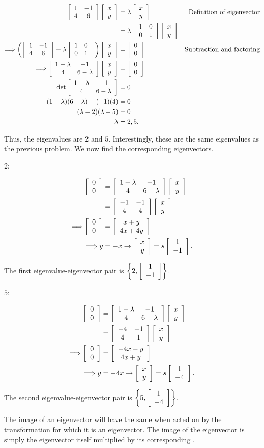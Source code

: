 \documentclass[../key.tex]{subfiles}
\begin{document}
\begin{align*}
\twomat{1}{-1}{4}{6}\twovec{x}{y} &= \lambda\twovec{x}{y} & \text{Definition of eigenvector} \\
&= \lambda\twomat{1}{0}{0}{1}\twovec{x}{y} \\
\Longrightarrow \left(\twomat{1}{-1}{4}{6}-\lambda\twomat{1}{0}{0}{1}\right)\twovec{x}{y}&=\twovec{0}{0} & \text{Subtraction and factoring} \\
\Longrightarrow \twomat{1-\lambda}{-1}{4}{6-\lambda}\twovec{x}{y} &= \twovec{0}{0} \\
\det \twomat{1-\lambda}{-1}{4}{6-\lambda} &= 0 \\
(1-\lambda)(6-\lambda)-(-1)(4) &= 0 \\
(\lambda-2)(\lambda-5) &= 0 \\
\lambda &= 2,5.\\
\end{align*}

Thus, the eigenvalues are $2$ and $5$. Interestingly, these are the same eigenvalues as the previous problem. We now find the corresponding eigenvectors.

$2$:

\begin{align*}
\twovec{0}{0} &= \twomat{1-\lambda}{-1}{4}{6-\lambda}\twovec{x}{y} \\
&= \twomat{-1}{-1}{4}{4}\twovec{x}{y} \\
\Longrightarrow \twovec{0}{0} &= \twovec{x+y}{4x+4y} \\
\Longrightarrow y&=-x \rightarrow \twovec{x}{y}=s\twovec{1}{-1}.
\end{align*}

The first eigenvalue-eigenvector pair is $\left\{2, \twovec{1}{-1}\right\}$.

$5$:

\begin{align*}
\twovec{0}{0} &= \twomat{1-\lambda}{-1}{4}{6-\lambda}\twovec{x}{y} \\
&= \twomat{-4}{-1}{4}{1}\twovec{x}{y} \\
\Longrightarrow \twovec{0}{0} &= \twovec{-4x-y}{4x+y} \\
\Longrightarrow y&=-4x \rightarrow \twovec{x}{y}=s\twovec{1}{-4}.
\end{align*}

The second eigenvalue-eigenvector pair is $\left\{5, \twovec{1}{-4}\right\}$.

\begin{outer_problem}
\item The image of an eigenvector will have the same \underline{\phantom{direction}} when acted on by the transformation \underline{\phantom{matrix}} for which it is an eigenvector. The image of the eigenvector is simply the eigenvector itself multiplied by its corresponding \underline{\phantom{eigenvalue}}.
\end{outer_problem}
\end{document}

